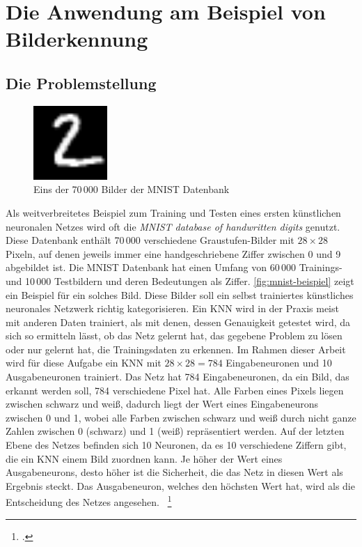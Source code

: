 \section{Die Anwendung am Beispiel von Bilderkennung}\label{sec:anwendung}

\subsection{Die Problemstellung}\label{subsec:problemstellung}
\begin{figure}
    \includegraphics[width=0.25\textwidth]{grafiken/mnist_beispiel}
    \caption[Eins der 70\,000 Bilder der MNIST Datenbank: \textit{MNIST database of handwritten digits}]{Eins der 70\,000 Bilder der MNIST Datenbank}
    \label{fig:mnist-beispiel}
\end{figure}
Als weitverbreitetes Beispiel zum Training und Testen eines ersten künstlichen neuronalen Netzes wird oft die \textit{MNIST database of handwritten digits} genutzt.
Diese Datenbank enthält 70\,000 verschiedene Graustufen-Bilder mit $28 \times 28$ Pixeln, auf denen jeweils immer eine handgeschriebene Ziffer zwischen 0 und 9 abgebildet ist.
Die MNIST Datenbank hat einen Umfang von 60\,000 Trainings- und 10\,000 Testbildern und deren Bedeutungen als Ziffer.
\autoref{fig:mnist-beispiel} zeigt ein Beispiel für ein solches Bild.
Diese Bilder soll ein selbst trainiertes künstliches neuronales Netzwerk richtig kategorisieren.
Ein KNN wird in der Praxis meist mit anderen Daten trainiert, als mit denen, dessen Genauigkeit getestet wird, da sich so ermitteln lässt, ob das Netz gelernt hat, das gegebene Problem zu lösen oder nur gelernt hat, die Trainingsdaten zu erkennen.
Im Rahmen dieser Arbeit wird für diese Aufgabe ein KNN mit $28 \times 28 = 784$ Eingabeneuronen und 10 Ausgabeneuronen trainiert.
Das Netz hat 784 Eingabeneuronen, da ein Bild, das erkannt werden soll, 784 verschiedene Pixel hat.
Alle Farben eines Pixels liegen zwischen schwarz und weiß, dadurch liegt der Wert eines Eingabeneurons zwischen 0 und 1, wobei alle Farben zwischen schwarz und weiß durch nicht ganze Zahlen zwischen 0 (schwarz) und 1 (weiß) repräsentiert werden.
Auf der letzten Ebene des Netzes befinden sich 10 Neuronen, da es 10 verschiedene Ziffern gibt, die ein KNN einem Bild zuordnen kann.
Je höher der Wert eines Ausgabeneurons, desto höher ist die Sicherheit, die das Netz in diesen Wert als Ergebnis steckt.
Das Ausgabeneuron, welches den höchsten Wert hat, wird als die Entscheidung des Netzes angesehen.
~\footcite{3b1b-3, mnist}

